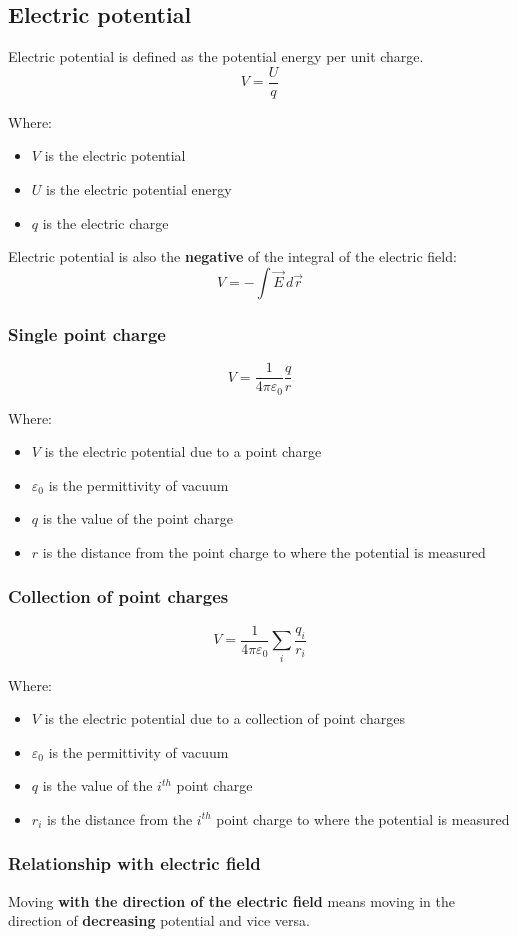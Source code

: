 \documentclass[11pt]{article}
\begin{document}
\subsection{Electric potential}
\label{sec:orgfcc995f}
Electric potential is defined as the potential energy per unit charge.
\[V = \frac{U}{q}\]

Where:
\begin{itemize}
\item \(V\) is the electric potential
\item \(U\) is the electric potential energy
\item \(q\) is the electric charge
\end{itemize}

Electric potential is also the \textbf{negative} of the integral of the electric field:
\[V = - \int \vec{E} \, d \vec{r}\]
\subsubsection{Single point charge}
\label{sec:org1fc5a31}
\[V = \frac{1}{4 \pi \varepsilon_0} \frac{q}{r}\]

Where:
\begin{itemize}
\item \(V\) is the electric potential due to a point charge
\item \(\varepsilon_0\) is the permittivity of vacuum
\item \(q\) is the value of the point charge
\item \(r\) is the distance from the point charge to where the potential is measured
\end{itemize}
\subsubsection{Collection of point charges}
\label{sec:org519f24c}
\[V = \frac{1}{4 \pi \varepsilon_0} \sum_i \frac{q_i}{r_i}\]

Where:
\begin{itemize}
\item \(V\) is the electric potential due to a collection of point charges
\item \(\varepsilon_0\) is the permittivity of vacuum
\item \(q\) is the value of the \(i^{th}\) point charge
\item \(r_i\) is the distance from the \(i^{th}\) point charge to where the potential is measured
\end{itemize}
\subsubsection{Relationship with electric field}
\label{sec:orgb81c117}
Moving \textbf{with the direction of the electric field} means moving in the direction of \textbf{decreasing} potential and vice versa.
\end{document}
